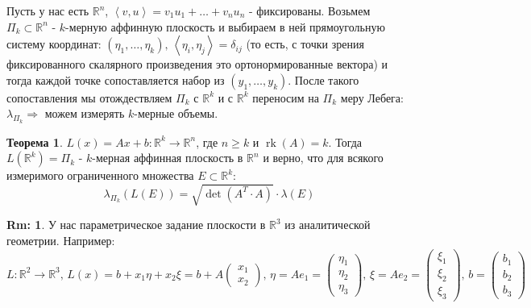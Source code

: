 \documentclass[12pt]{article}
\newcommand{\MR}{\mathbb{R}}
\theoremstyle{definition}
\newtheorem{rem}{Rm:}
\newtheorem{theorem}{Теорема}
\DeclareMathOperator{\rk}{\text{rk}}
\newcommand{\inner}[2]{\left\langle #1, #2 \right\rangle }
\begin{document}
Пусть у нас есть $\MR^n$, $\inner{v}{u} = v_1u_1 + \dotsc + v_n u_n$ - фиксированы. Возьмем $\Pi_k \subset \MR^n$ - $k$-мерную аффинную плоскость и выбираем в ней прямоугольную систему координат: $(\eta_1,\dotsc, \eta_k), \, \inner{\eta_i}{\eta_j} = \delta_{ij}$ (то есть, с точки зрения фиксированного скалярного произведения это ортонормированные вектора) и тогда каждой точке сопоставляется набор из $(y_1,\dotsc, y_k)$. После такого сопоставления мы отождествляем $\Pi_k$ с $\MR^k$ и с $\MR^k$ переносим на $\Pi_k$ меру Лебега: $\lambda_{\Pi_k} \Rightarrow$ можем измерять $k$-мерные объемы.
\begin{theorem}
	$L(x) = Ax + b \colon \MR^k \to \MR^n$, где $n \geq k$ и $\rk{(A)} = k$. Тогда $L(\MR^k) = \Pi_k$ - $k$-мерная аффинная плоскость в $\MR^n$ и верно, что для всякого измеримого ограниченного множества $E \subset \MR^k$:
	$$
		\lambda_{\Pi_k}(L(E)) = \sqrt{\det{(A^T{\cdot}A)}}{\cdot}\lambda(E)
	$$
\end{theorem}
\begin{rem}
	У нас параметрическое задание плоскости в $\MR^3$ из аналитической геометрии. Например:
	$$
		L \colon \MR^2 \to \MR^3, \, L(x) = b + x_1\eta + x_2 \xi = b + A
		\begin{pmatrix}
			x_1 \\
			x_2
		\end{pmatrix}, \, \eta = Ae_1 = 
		\begin{pmatrix}
			\eta_1 \\
			\eta_2\\
			\eta_3
		\end{pmatrix}, \, \xi = Ae_2 =
		\begin{pmatrix}
			\xi_1 \\
			\xi_2\\
			\xi_3
		\end{pmatrix}, \, 
		b = \begin{pmatrix}
			b_1 \\
			b_2\\
			b_3
		\end{pmatrix}
	$$
\end{rem}
\end{document}
